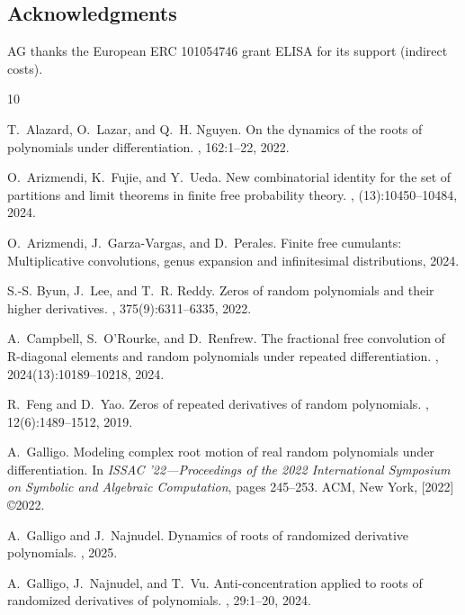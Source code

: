 \documentclass[11pt]{amsart}
\begin{document}
\subsection*{Acknowledgments}
AG thanks the European ERC 101054746 grant ELISA for its support (indirect costs).
%
%
\begin{thebibliography}{10}

T.~Alazard, O.~Lazar, and Q.~H. Nguyen.
\newblock On the dynamics of the roots of polynomials under differentiation.
, 162:1--22, 2022.

O.~Arizmendi, K.~Fujie, and Y.~Ueda.
\newblock New combinatorial identity for the set of partitions and limit theorems in finite free probability theory.
, (13):10450--10484, 2024.

O.~Arizmendi, J.~Garza-Vargas, and D.~Perales.
\newblock Finite free cumulants: Multiplicative convolutions, genus expansion and infinitesimal distributions, 2024.

S.-S. Byun, J.~Lee, and T.~R. Reddy.
\newblock Zeros of random polynomials and their higher derivatives.
, 375(9):6311--6335, 2022.

A.~Campbell, S.~O’Rourke, and D.~Renfrew.
\newblock The fractional free convolution of {R}-diagonal elements and random polynomials under repeated differentiation.
, 2024(13):10189--10218, 2024.

R.~Feng and D.~Yao.
\newblock Zeros of repeated derivatives of random polynomials.
, 12(6):1489--1512, 2019.

A.~Galligo.
\newblock Modeling complex root motion of real random polynomials under differentiation.
\newblock In {\em I{SSAC} '22---{P}roceedings of the 2022 {I}nternational {S}ymposium on {S}ymbolic and {A}lgebraic {C}omputation}, pages 245--253. ACM, New York, [2022] \copyright 2022.

A.~Galligo and J.~Najnudel.
\newblock Dynamics of roots of randomized derivative polynomials.
, 2025.

A.~Galligo, J.~Najnudel, and T.~Vu.
\newblock Anti-concentration applied to roots of randomized derivatives of polynomials.
, 29:1--20, 2024.


\end{thebibliography}
\end{document}
